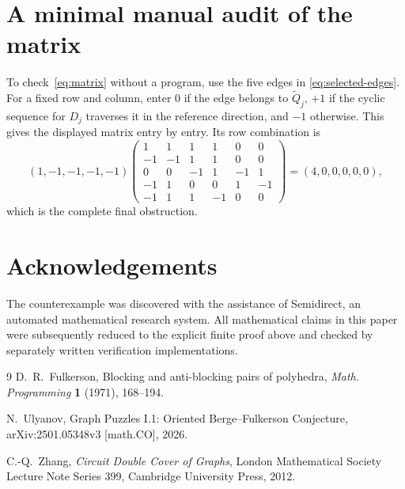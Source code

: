 \documentclass[11pt]{article}
\theoremstyle{definition}
\begin{document}
\section{A minimal manual audit of the matrix}

To check~\eqref{eq:matrix} without a program, use the five edges in
\eqref{eq:selected-edges}.  For a fixed row and column, enter $0$ if the edge
belongs to $\widetilde Q_j$, $+1$ if the cyclic sequence for $D_j$ traverses
it in the reference direction, and $-1$ otherwise.  This gives the displayed
matrix entry by entry.  Its row combination is
\[
(1,-1,-1,-1,-1)
\begin{pmatrix}
 1& 1& 1& 1& 0& 0\\
-1&-1& 1& 1& 0& 0\\
 0& 0&-1& 1&-1& 1\\
-1& 1& 0& 0& 1&-1\\
-1& 1& 1&-1& 0& 0
\end{pmatrix}
=(4,0,0,0,0,0),
\]
which is the complete final obstruction.

\section*{Acknowledgements}

The counterexample was discovered with the assistance of Semidirect, an
automated mathematical research system.  All mathematical claims in this
paper were subsequently reduced to the explicit finite proof above and
checked by separately written verification implementations.

\begin{thebibliography}{9}
D.~R.~Fulkerson,
Blocking and anti-blocking pairs of polyhedra,
\emph{Math. Programming} \textbf{1} (1971), 168--194.

N.~Ulyanov,
Graph Puzzles I.1: Oriented Berge--Fulkerson Conjecture,
arXiv:2501.05348v3 [math.CO], 2026.

C.-Q.~Zhang,
\emph{Circuit Double Cover of Graphs},
London Mathematical Society Lecture Note Series 399,
Cambridge University Press, 2012.
\end{thebibliography}
\end{document}
